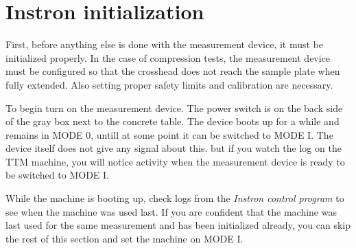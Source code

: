 \documentclass[a4paper]{article}
\begin{document}
\section{Instron initialization}

First, before anything else is done with the measurement device, it
must be initialized properly. In the case of compression tests, the
measurement device must be configured so that the crosshead does not
reach the sample plate when fully extended. Also setting proper safety
limits and calibration are necessary.


To begin turn on the measurement device. The power switch is on the
back side of the gray box next to the concrete table. The device boots
up for a while and remains in \textsf{MODE 0}, untill at some point it
can be switched to \textsf{MODE I}. The device itself does not give
any signal about this. but if you watch the log on the TTM machine,
you will notice activity when the measurement device is ready to be
switched to \textsf{MODE I}.

While the machine is booting up, check logs from the {\it Instron
control program} to see when the machine was used last. If you are
confident that the machine was last used for the same measurement and
has been initialized already, you can skip the rest of this section
and set the machine on \textsf{MODE I}.
\end{document}
